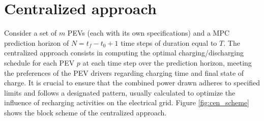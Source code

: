 \section{Centralized approach}
Consider a set of $m$ PEVs (each with its own specifications) and a MPC prediction horizon of $N = t_f - t_0 + 1$ time steps of duration equal to $T$. The centralized approach consists in computing the optimal charging/discharging schedule for each PEV $p$ at each time step over the prediction horizon, meeting the preferences of the PEV drivers regarding charging time and final state of charge. It is crucial to ensure that the combined power drawn adheres to specified limits and follows a designated pattern, usually calculated to optimize the influence of recharging activities on the electrical grid.
Figure \ref{fig:cen_scheme} shows the block scheme of the centralized approach.


